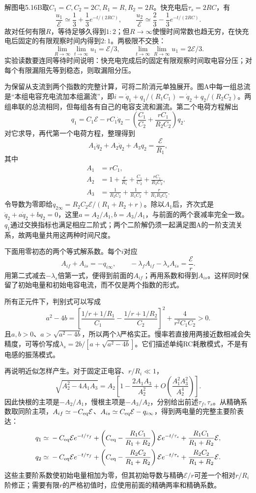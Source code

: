 \documentclass[UTF8,fontset=fandol,a4paper,11pt]{ctexart}
\begin{document}
解图电5.16B取$C_1=C,C_2=2C,R_1=R,R_2=2R$。快充电后$\tau_s=2RC$，有
\[
 \frac{u_1}{\mathcal E}\simeq\frac13+\frac13e^{-t/(2RC)},
 \qquad
 \frac{u_2}{\mathcal E}\simeq\frac23-\frac13e^{-t/(2RC)}.
\]
故对任何有限$R$，等待足够久得到$1:2$；但$R\to\infty$使慢时间常数也趋无穷，在快充电后固定的有限观察时间内得到$2:1$。两极限不交换：
\[
 \lim_{R\to\infty}\lim_{t\to\infty}u_1=\mathcal E/3,\qquad
 \lim_{t\to\infty}\lim_{R\to\infty}u_1=2\mathcal E/3.
\]
实验读数要连同等待时间说明：快充电完成后的固定有限观察时间取电容分压；对每个有限漏阻先等到稳态，则取漏阻分压。


为保留从支流到两个指数的完整计算，可将二阶消元单独展开。图A中每一组总流是“本组电容充电流加本组漏流”，即$i=\dot q_1+q_1/(R_1C_1)=\dot q_2+q_2/(R_2C_2)$。两组串联的总流相同，但每组各有自己的电容支流和漏流。第二个电荷方程解出
\[
q_1=C_1\mathcal E-rC_1\dot q_2
-\left(\frac{C_1}{C_2}+\frac{rC_1}{R_2C_2}\right)q_2.
\]
对它求导，再代第一个电荷方程，整理得到
\[
A_1\ddot q_2+A_2\dot q_2+A_3q_2=\frac{\mathcal E}{R_1},
\]
其中
\[
\begin{aligned}
A_1&=rC_1,\\
A_2&=1+\frac r{R_1}+\frac{C_1}{C_2}
+\frac{rC_1}{R_2C_2},\\
A_3&=\frac1{R_2C_2}+\frac1{R_1C_2}
+\frac r{R_1R_2C_2}.
\end{aligned}
\]
令导数为零即给$q_{2\infty}=R_2C_2\mathcal E/(R_1+R_2+r)$。除以$A_1$后，齐次式是$\ddot q_2+a\dot q_2+bq_2=0$，这里$a=A_2/A_1,b=A_3/A_1$，与前面的两个衰减率完全一致。$q_1$通过交换指标也满足相应二阶式；两个二阶解仍须一起满足图A的一阶支流关系，故两电量共用这两种时间尺度。

下面用零初态的两个等式解系数。每个$i$对应
\[
A_{if}+A_{is}=-q_{i\infty},\qquad
-\lambda_f A_{if}-\lambda_s A_{is}=\frac{\mathcal E}{r}.
\]
用第二式减去$-\lambda_s$倍第一式，便得到前面的$A_{if}$；再用系数和得到$A_{is}$。这样同时保留了初始电量和初始电容电流，而不仅是两个指数的形式。

所有正元件下，判别式可以写成
\[
a^2-4b=
\left[\frac{1/r+1/R_1}{C_1}
-\frac{1/r+1/R_2}{C_2}\right]^2
+\frac4{r^2C_1C_2}>0.
\]
且$a,b>0$、$a>\sqrt{a^2-4b}$，所以两个$\lambda$严格实正。慢率若直接用两接近数相减会失精度，可等价写成$\lambda_s=2b/[a+\sqrt{a^2-4b}]$。它们描述单纯RC耗散模式，不是有电感的振荡模式。

再说明近似怎样产生。对于固定正电容、$r/R_i\ll1$，
\[
\sqrt{A_2^2-4A_1A_3}
=A_2\left[1-\frac{2A_1A_3}{A_2^2}
+O\!\left(\frac{A_1^2A_3^2}{A_2^4}\right)\right].
\]
因此快根的主项是$-A_2/A_1$，慢根主项是$-A_3/A_2$，分别给出前述$\tau_f,\tau_s$。从精确系数取同阶主项，$A_{if}\simeq-C_{\rm eq}\mathcal E$、$A_{is}\simeq C_{\rm eq}\mathcal E-q_{i\infty}$，得到两电量的完整主要阶表达：
\[
\begin{aligned}
q_1\simeq{}&-C_{\rm eq}\mathcal E e^{-t/\tau_f}
+\left(C_{\rm eq}-\frac{R_1C_1}{R_1+R_2}\right)
 \mathcal E e^{-t/\tau_s}
+\frac{R_1C_1}{R_1+R_2}\mathcal E,\\
q_2\simeq{}&-C_{\rm eq}\mathcal E e^{-t/\tau_f}
+\left(C_{\rm eq}-\frac{R_2C_2}{R_1+R_2}\right)
 \mathcal E e^{-t/\tau_s}
+\frac{R_2C_2}{R_1+R_2}\mathcal E.
\end{aligned}
\]
这些主要阶系数使初始电量相加为零，但其初始导数与精确$\mathcal E/r$可差一个相对$r/R_i$阶修正；需要有限$r$的严格初值时，应使用前面的精确两率和精确系数。
\end{document}
